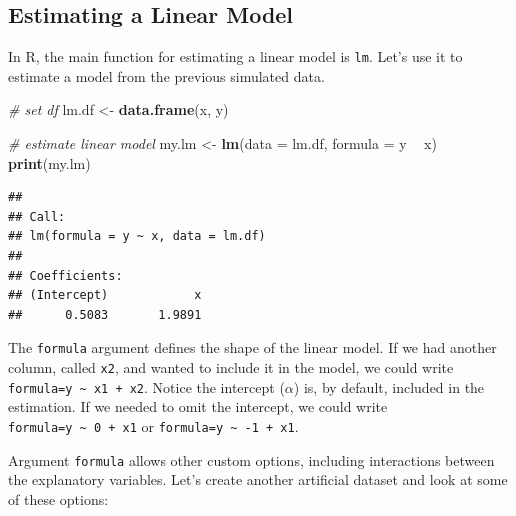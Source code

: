 \documentclass[11pt,]{book}
\newenvironment{Shaded}{\begin{snugshade}}{\end{snugshade}}
\newcommand{\KeywordTok}[1]{\textcolor[rgb]{0.27,0.27,0.27}{\textbf{#1}}}
\newcommand{\DataTypeTok}[1]{\textcolor[rgb]{0.27,0.27,0.27}{#1}}
\newcommand{\StringTok}[1]{\textcolor[rgb]{0.5,0.5,0.5}{#1}}
\newcommand{\CommentTok}[1]{\textcolor[rgb]{0.56,0.35,0.01}{\textit{#1}}}
\newcommand{\OperatorTok}[1]{\textcolor[rgb]{0.81,0.36,0.00}{\textbf{#1}}}
\newcommand{\NormalTok}[1]{#1}
\begin{document}
\subsection{Estimating a Linear Model}\label{estimating-ols}

In R, the main function for estimating a linear model is \texttt{lm}.
Let's use it to estimate a model from the previous simulated data.

\begin{Shaded}
\begin{Highlighting}[]
\CommentTok{# set df}
\NormalTok{lm.df <-}\StringTok{ }\KeywordTok{data.frame}\NormalTok{(x, y)}

\CommentTok{# estimate linear model}
\NormalTok{my.lm <-}\StringTok{ }\KeywordTok{lm}\NormalTok{(}\DataTypeTok{data =}\NormalTok{ lm.df, }\DataTypeTok{formula =}\NormalTok{ y }\OperatorTok{~}\StringTok{ }\NormalTok{x)}
\KeywordTok{print}\NormalTok{(my.lm)}
\end{Highlighting}
\end{Shaded}

\begin{verbatim}
## 
## Call:
## lm(formula = y ~ x, data = lm.df)
## 
## Coefficients:
## (Intercept)            x  
##      0.5083       1.9891
\end{verbatim}

The \texttt{formula} argument defines the shape of the linear model. If
we had another column, called \texttt{x2}, and wanted to include it in
the model, we could write
\texttt{formula=y\ \textasciitilde{}\ x1\ +\ x2}. Notice the intercept
(\(\alpha\)) is, by default, included in the estimation. If we needed to
omit the intercept, we could write
\texttt{formula=y\ \textasciitilde{}\ 0\ +\ x1} or
\texttt{formula=y\ \textasciitilde{}\ -1\ +\ x1}.

Argument \texttt{formula} allows other custom options, including
interactions between the explanatory variables. Let's create another
artificial dataset and look at some of these options:
\end{document}
